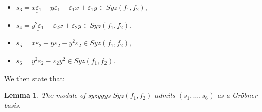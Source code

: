 \documentclass[sigconf]{acmart}
\theoremstyle{plain}
\newtheorem{lem}{Lemma}[section]
\theoremstyle{definition}
\theoremstyle{remark}
\begin{document}
\begin{itemize}
\item $s_3=\underline{x \varepsilon_1}-y\varepsilon_1- \varepsilon_1 x + \varepsilon_1 y \in Syz(f_1,f_2)$,
\item $s_4=\underline{y^2 \varepsilon_1}-\varepsilon_2 x +  \varepsilon_2 y \in Syz(f_1,f_2)$.
\item $s_5=\underline{x \varepsilon_2}-y\varepsilon_2- y^2 \varepsilon_2  \in Syz(f_1,f_2)$,
\item $s_6=\underline{y^2 \varepsilon_2}-\varepsilon_2 y^2 \in Syz(f_1,f_2)$.
\end{itemize}

We then state that:
\begin{lem}
The module of syzygys $Syz(f_1,f_2)$ admits $(s_1,\dots,s_6)$
as a Gröbner basis.
\end{lem}
\end{document}
